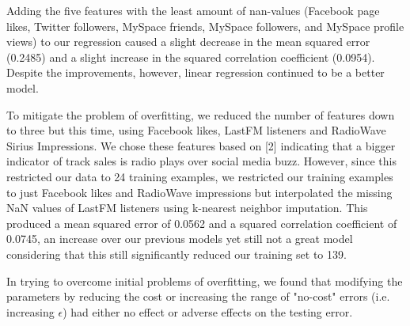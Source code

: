 \documentclass[conference]{IEEEtran}
\begin{document}
{Adding the five features with the least amount of nan-values (Facebook page likes, Twitter followers, MySpace friends, MySpace followers, and MySpace profile views) to our regression caused a slight decrease in the mean squared error (0.2485) and a slight increase in the squared correlation coefficient (0.0954). Despite the improvements, however, linear regression continued to be a better model.

To mitigate the problem of overfitting, we reduced the number of features down to three but this time, using Facebook likes, LastFM listeners and RadioWave Sirius Impressions. We chose these features based on [2] indicating that a bigger indicator of track sales is radio plays over social media buzz. However, since this restricted our data to 24 training examples, we restricted our training examples to just Facebook likes and RadioWave impressions but interpolated the missing NaN values of LastFM listeners using k-nearest neighbor imputation. This produced a mean squared error of 0.0562 and a squared correlation coefficient of 0.0745, an increase over our previous models yet still not a great model considering that this still significantly reduced our training set to 139.

In trying to overcome initial problems of overfitting, we found that modifying the parameters by reducing the cost or increasing the  range of "no-cost" errors (i.e. increasing $\epsilon$) had either no effect or adverse effects on the testing error.


%
%

}
\end{document}
